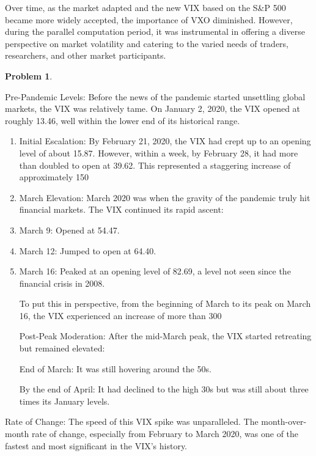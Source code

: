 \documentclass[12pt, a4paper]{article}
\newtheorem{problem}{Problem}
\theoremstyle{definition}
\begin{document}
\quad Over time, as the market adapted and the new VIX based on the S\&P 500 became more widely accepted, the importance of VXO diminished. However, during the parallel computation period, it was instrumental in offering a diverse perspective on market volatility and catering to the varied needs of traders, researchers, and other market participants.
\begin{problem}
\end{problem}
Pre-Pandemic Levels: Before the news of the pandemic started unsettling global markets, the VIX was relatively tame. On January 2, 2020, the VIX opened at roughly 13.46, well within the lower end of its historical range.
\begin{enumerate}[label=\roman*.]
\item Initial Escalation: By February 21, 2020, the VIX had crept up to an opening level of about 15.87. However, within a week, by February 28, it had more than doubled to open at 39.62. This represented a staggering increase of approximately 150%

\item March Elevation: March 2020 was when the gravity of the pandemic truly hit financial markets. The VIX continued its rapid ascent:

\item March 9: Opened at 54.47.

\item March 12: Jumped to open at 64.40.

\item March 16: Peaked at an opening level of 82.69, a level not seen since the financial crisis in 2008.

To put this in perspective, from the beginning of March to its peak on March 16, the VIX experienced an increase of more than 300%

Post-Peak Moderation: After the mid-March peak, the VIX started retreating but remained elevated:

End of March: It was still hovering around the 50s.

By the end of April: It had declined to the high 30s but was still about three times its January levels.

\end{enumerate}
\quad Rate of Change: The speed of this VIX spike was unparalleled. The month-over-month rate of change, especially from February to March 2020, was one of the fastest and most significant in the VIX's history.
\\
\end{document}
